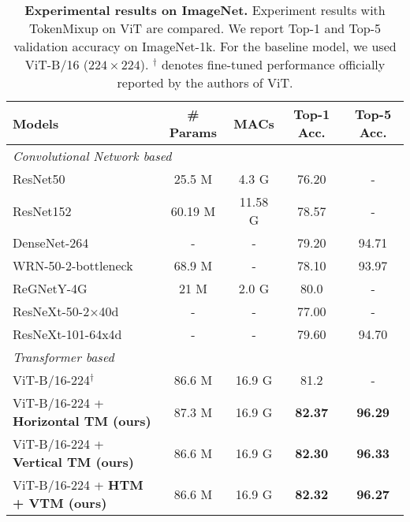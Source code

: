 \documentclass{article}
\begin{document}
\begin{table}[t]
    \centering
    \setlength{\tabcolsep}{3.5pt}
    \caption{ \footnotesize \textbf{Experimental results on ImageNet.} Experiment results with TokenMixup on ViT are compared. We report Top-1 and Top-5 validation accuracy on ImageNet-1k. For the baseline model, we used ViT-B/16 ($224\times224$). $^\dagger$ denotes fine-tuned performance officially reported by the authors of ViT.}
    \begin{adjustbox}{width=0.9\textwidth}
    \begin{tabular}{l@{\hskip 0.3in} |@{\hskip 0.1in} c c@{\hskip 0.1in} |@{\hskip 0.1in} c@{\hskip 0.1in} c@{\hskip 0.1in}}
        \toprule
        \textbf{Models} & \textbf{\# Params} & \textbf{MACs} & \textbf{Top-1 Acc.} & \textbf{Top-5 Acc.}  \\
        \midrule
        \midrule
        \multicolumn{5}{l}{\textit{Convolutional Network based}} \\ 
        \midrule
        ResNet50~\cite{he2016deep} & 25.5 M & 4.3 G & 76.20 & - \\
        ResNet152~\cite{he2016deep} & 60.19 M & 11.58 G & 78.57 & - \\
        DenseNet-264~\cite{huang2017densely} & - & - & 79.20 & 94.71 \\
        WRN-50-2-bottleneck~\cite{zagoruyko2016wide} & 68.9 M & - & 78.10 & 93.97 \\
        ReGNetY-4G~\cite{radosavovic2020designing} & 21 M & 2.0 G & 80.0 & - \\
        ResNeXt-50-2×40d~\cite{xie2017aggregated} & - & - & 77.00 & - \\
        ResNeXt-101-64x4d~\cite{xie2017aggregated} & - & - & 79.60 & 94.70 \\
        \midrule
        \multicolumn{5}{l}{\textit{Transformer based}} \\ 
        \midrule
        ViT-B/16-224$^{\dagger}$ ~\cite{dosovitskiy2020image}  & 86.6 M & 16.9 G  & 81.2 & - \\
        ViT-B/16-224 + \textbf{Horizontal TM (ours)} & 87.3 M & 16.9 G &  \cellcolor{yellow!25}\textbf{82.37} & \textbf{96.29} \\
        ViT-B/16-224 + \textbf{Vertical TM (ours)} & 86.6 M & 16.9 G & \textbf{82.30} & \cellcolor{yellow!25}\textbf{96.33} \\ ViT-B/16-224 + \textbf{HTM + VTM (ours)} & 86.6 M & 16.9 G & \textbf{82.32} & \textbf{96.27} \\ \bottomrule
    \end{tabular}
    \end{adjustbox}
    \label{tab:imagenet}
\end{table}
\end{document}
